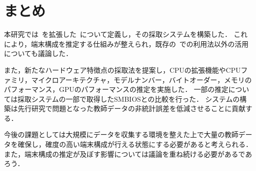 \newpage
\section{まとめ}
本研究では\fp~を拡張した\hfp~について定義し，その採取システムを構築した．
これにより，端末構成を推定する仕組みが整えられ，既存の\fp~での利用法以外の活用についても議論した．

また，新たなハードウェア特徴点の採取法を提案し，CPUの拡張機能やCPUファミリ，マイクロアーキテクチャ，モデルナンバー，バイトオーダー，メモリのパフォーマンス，GPUのパフォーマンスの推定を実施した．
一部の推定については採取システムの一部で取得したSMBIOSとの比較を行った．
システムの構築は先行研究で問題となった教師データの非統計誤差を低減させることに貢献する．

今後の課題としては大規模にデータを収集する環境を整えた上で大量の教師データを確保し，確度の高い端末構成が行える状態にする必要があると考えられる．また，端末構成の推定が及ぼす影響については議論を重ね続ける必要があるであろう．